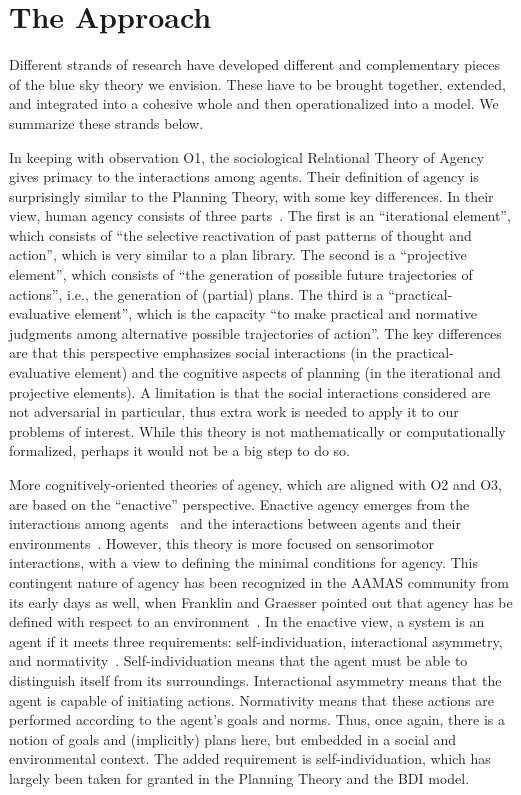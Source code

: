 \section{The Approach}
\label{sec:approach}

Different strands of research have developed different and complementary pieces of the blue sky theory we envision. These have to be
brought together, extended, and integrated into a cohesive whole and then operationalized into a model. We summarize these strands below.

In keeping with observation O1, the sociological Relational Theory of Agency~\citep{emirbayer98agency, burkitt16relational} gives primacy to the
interactions among agents. Their definition of agency is surprisingly similar to the Planning Theory, with some key differences. In their view, human agency
consists of three parts~\citep{emirbayer98agency}. The first is an ``iterational element'', which consists of ``the selective reactivation of 
past patterns of thought and action'', which is very similar to a plan library. The second is a ``projective element'', which consists of ``the
generation of possible future trajectories of actions'', i.e., the generation of (partial) plans. The third is a ``practical-evaluative 
element'', which is the capacity ``to make practical and normative judgments among alternative possible trajectories of action''. The key
differences are that this perspective emphasizes social interactions (in the practical-evaluative element) and the cognitive aspects of planning
(in the iterational and projective elements). A limitation is that the social interactions considered are not adversarial in particular, thus 
extra work is needed to apply it to our problems of interest. While this theory is not mathematically or computationally formalized, perhaps it 
would not be a big step to do so.

More cognitively-oriented theories of agency, which are aligned with O2 and O3, are based on the ``enactive'' perspective. Enactive agency 
emerges from the interactions among agents~\citep{dejaegher09socialInteraction} and the interactions between agents and their 
environments~\citep{dipaolo17sensorimotor}. However, this theory is more focused on sensorimotor interactions, with a view to defining the
minimal conditions for agency. This contingent nature of agency has been recognized in the AAMAS community from its early days as 
well, when Franklin and Graesser pointed out that agency has be defined with respect to an environment~\citep{franklin97agentTaxonomy}.
In the enactive view, a system is an agent if it meets three requirements: self-individuation, interactional asymmetry, and 
normativity~\cite[Ch. 5]{dipaolo17sensorimotor}. Self-individuation means that the agent must be able to distinguish itself from its 
surroundings. Interactional asymmetry means that the agent is capable of initiating actions. Normativity means that these actions are
performed according to the agent's goals and norms. Thus, once again, there is a notion of goals and (implicitly) plans here, but embedded
in a social and environmental context. The added requirement is self-individuation, which has largely been taken for granted in the Planning
Theory and the BDI model.

